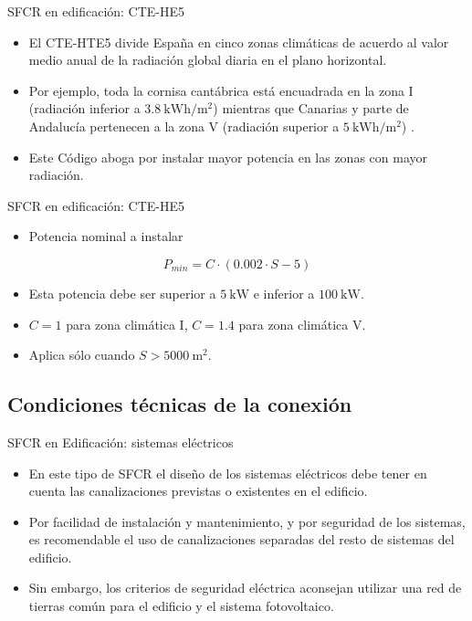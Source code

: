 \documentclass[xcolor={usenames,svgnames,dvipsnames}]{beamer}
\begin{document}
\begin{frame}[label=sec-1-3-10]{SFCR en edificación: CTE-HE5}
\begin{itemize}
\item El CTE-HTE5 divide España en cinco zonas climáticas de acuerdo al valor medio anual de la radiación global diaria en el plano horizontal.

\item Por ejemplo, toda la cornisa cantábrica está encuadrada en la zona I (radiación inferior a $\SI{3.8}{\kWh\per\meter\squared}$) mientras que Canarias y parte de Andalucía pertenecen a la zona V (radiación superior a $\SI{5}{\kWh\per\meter\squared}$) .

\item Este Código aboga por instalar mayor potencia en las zonas con mayor radiación.
\end{itemize}
\end{frame}

\begin{frame}[label=sec-1-3-11]{SFCR en edificación: CTE-HE5}
\begin{itemize}
\item Potencia \alert{nominal} a instalar
\end{itemize}

$$P_{min}=C\cdot(0.002\cdot S - 5)$$

\begin{itemize}
\item Esta potencia debe ser superior a $\SI{5}{\kilo\watt}$ e inferior a $\SI{100}{\kilo\watt}$.

\item $C=1$ para zona climática I, $C=1.4$ para zona climática V.

\item Aplica sólo cuando $S > \SI{5000}{\meter\squared}$.
\end{itemize}
\end{frame}

\subsection{Condiciones técnicas de la conexión}
\label{sec-1-4}

\begin{frame}[label=sec-1-4-1]{SFCR en Edificación: sistemas eléctricos}
\begin{itemize}
\item En este tipo de SFCR el diseño de los sistemas eléctricos debe tener en cuenta las canalizaciones previstas o existentes en el edificio.

\item Por facilidad de instalación y mantenimiento, y por seguridad de los sistemas, es recomendable el uso de canalizaciones separadas del resto de sistemas del edificio.

\item Sin embargo, los criterios de seguridad eléctrica aconsejan utilizar una \alert{red de tierras común} para el edificio y el sistema fotovoltaico.
\end{itemize}
\end{frame}
\end{document}
